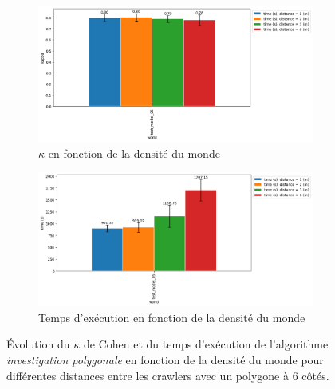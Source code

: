 \documentclass[francais,RandD]{rapportPFE}
\begin{document}
			\begin{figure}[h!]
				\begin{subfigure}[t]{0.9\linewidth}
					\includegraphics[width=\linewidth]{graphics/investigation_polygonale-kappa_vs_world_for_each_d_k1_n2_p6.png}
					\caption{$\kappa$ en fonction de la densité du monde}
					\label{fig:investigation_polygonale-kappa_vs_world_for_each_d_k1_n2_p6}
				\end{subfigure}
				\hfill
				\begin{subfigure}[t]{0.9\linewidth}
						\includegraphics[width=\linewidth]{graphics/investigation_polygonale-time_vs_world_for_each_d_k1_n2_p6.png}
						\caption{Temps d'exécution en fonction de la densité du monde}
						\label{fig:investigation_polygonale-time_vs_world_for_each_d_k1_n2_p6}
				\end{subfigure}
				\caption{Évolution du $\kappa$ de Cohen et du temps d'exécution de l'algorithme \textit{investigation polygonale} en fonction de la densité du monde pour différentes distances entre les crawlers avec un polygone à 6 côtés.}
				\label{fig:investigation_polygonale-world_for_each_d_k1_n2_p6}
			\end{figure}
\end{document}
